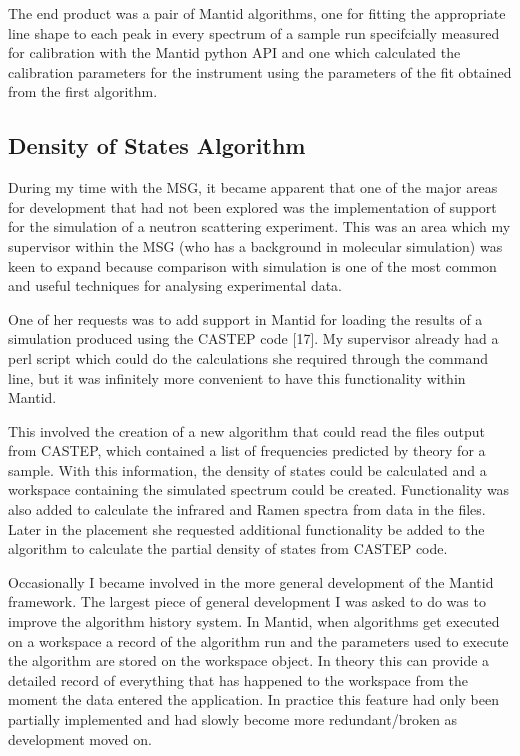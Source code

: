 \documentclass[paper=a4, fontsize=11pt]{scrartcl}	%
\numberwithin{equation}{section}															%
\numberwithin{figure}{section}																%
\numberwithin{table}{section}
\begin{document}
The end product was a pair of Mantid algorithms, one for fitting the
appropriate line shape to each peak in every spectrum of a sample run
specifcially measured for calibration with the Mantid python API and one
which calculated the calibration parameters for the instrument using the
parameters of the fit obtained from the first algorithm.

\subsection{Density of States
Algorithm}\label{density-of-states-algorithm}

During my time with the MSG, it became apparent that one of the major
areas for development that had not been explored was the implementation
of support for the simulation of a neutron scattering experiment. This
was an area which my supervisor within the MSG (who has a background in molecular
simulation) was keen to expand because comparison with simulation is
one of the most common and useful techniques for analysing experimental
data.

One of her requests was to add support in Mantid for loading the results
of a simulation produced using the CASTEP code {[}17{]}. My supervisor
already had a perl script which could do the calculations she required
through the command line, but it was infinitely more convenient to have
this functionality within Mantid.

This involved the creation of a new algorithm that could read the files
output from CASTEP, which contained a list of frequencies predicted by
theory for a sample. With this information, the density of states could
be calculated and a workspace containing the simulated spectrum could be
created. Functionality was also added to calculate the infrared and
Ramen spectra from data in the files. Later in the placement she requested additional functionality be added to the algorithm to
calculate the partial density of states from CASTEP code.


Occasionally I became involved in the more general development of the
Mantid framework. The largest piece of general development I was asked
to do was to improve the algorithm history system. In Mantid, when
algorithms get executed on a workspace a record of the algorithm run and
the parameters used to execute the algorithm are stored on the workspace
object. In theory this can provide a detailed record of everything that
has happened to the workspace from the moment the data entered the
application. In practice this feature had only been partially
implemented and had slowly become more redundant/broken as development
moved on.
\end{document}
